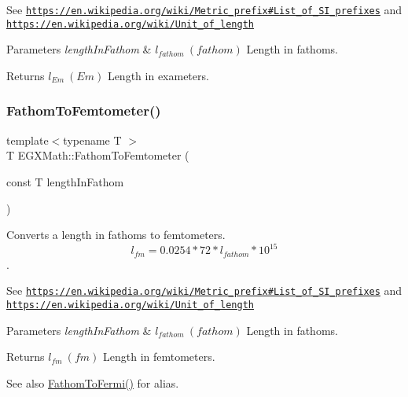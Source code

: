 See \href{https://en.wikipedia.org/wiki/Metric_prefix#List_of_SI_prefixes}{\tt https\+://en.\+wikipedia.\+org/wiki/\+Metric\+\_\+prefix\#\+List\+\_\+of\+\_\+\+S\+I\+\_\+prefixes} and \href{https://en.wikipedia.org/wiki/Unit_of_length}{\tt https\+://en.\+wikipedia.\+org/wiki/\+Unit\+\_\+of\+\_\+length} 
\begin{DoxyParams}{Parameters}
{\em length\+In\+Fathom} & $ l_{fathom}\ (fathom)$ Length in fathoms. \\
\hline
\end{DoxyParams}
\begin{DoxyReturn}{Returns}
$ l_{Em}\ (Em)$ Length in exameters. 
\end{DoxyReturn}
\mbox{\label{group___e_g_x_math-_conversions-_length_conversions-_nautical-_fathom-_s_i_ga507bda2a437e3cccfda56c2e48ad7262}} 
\subsubsection{\texorpdfstring{Fathom\+To\+Femtometer()}{FathomToFemtometer()}}
{\footnotesize\ttfamily template$<$typename T $>$ \\
T E\+G\+X\+Math\+::\+Fathom\+To\+Femtometer (\begin{DoxyParamCaption}\item[{const T}]{length\+In\+Fathom }\end{DoxyParamCaption})}



Converts a length in fathoms to femtometers. \[ l_{fm}=0.0254 * 72 * l_{fathom} * 10^{15} \]. 

See \href{https://en.wikipedia.org/wiki/Metric_prefix#List_of_SI_prefixes}{\tt https\+://en.\+wikipedia.\+org/wiki/\+Metric\+\_\+prefix\#\+List\+\_\+of\+\_\+\+S\+I\+\_\+prefixes} and \href{https://en.wikipedia.org/wiki/Unit_of_length}{\tt https\+://en.\+wikipedia.\+org/wiki/\+Unit\+\_\+of\+\_\+length} 
\begin{DoxyParams}{Parameters}
{\em length\+In\+Fathom} & $ l_{fathom}\ (fathom)$ Length in fathoms. \\
\hline
\end{DoxyParams}
\begin{DoxyReturn}{Returns}
$ l_{fm}\ (fm)$ Length in femtometers. 
\end{DoxyReturn}
\begin{DoxySeeAlso}{See also}
\mbox{\hyperlink{group___e_g_x_math-_conversions-_length_conversions-_nautical-_fathom-_non-_s_i_ga4590b655273e874c79a47de291226548}{Fathom\+To\+Fermi()}} for alias. 
\end{DoxySeeAlso}
\mbox{\label{group___e_g_x_math-_conversions-_length_conversions-_nautical-_fathom-_s_i_gacba836a61d9d2c6ad72195c06fab3f41}} 
